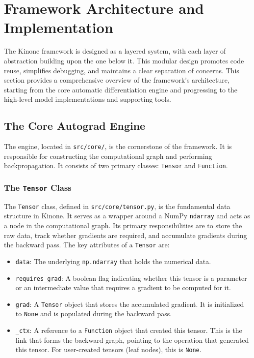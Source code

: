 \documentclass[a4paper]{article}
\begin{document}
\section{Framework Architecture and Implementation}

The Kinone framework is designed as a layered system, with each layer of abstraction building upon the one below it. This modular design promotes code reuse, simplifies debugging, and maintains a clear separation of concerns. This section provides a comprehensive overview of the framework's architecture, starting from the core automatic differentiation engine and progressing to the high-level model implementations and supporting tools.

\subsection{The Core Autograd Engine}

The engine, located in \texttt{src/core/}, is the cornerstone of the framework. It is responsible for constructing the computational graph and performing backpropagation. It consists of two primary classes: \texttt{Tensor} and \texttt{Function}.

\subsubsection{The \texttt{Tensor} Class}

The \texttt{Tensor} class, defined in \texttt{src/core/tensor.py}, is the fundamental data structure in Kinone. It serves as a wrapper around a NumPy \texttt{ndarray} and acts as a node in the computational graph. Its primary responsibilities are to store the raw data, track whether gradients are required, and accumulate gradients during the backward pass. The key attributes of a \texttt{Tensor} are:

\begin{itemize}
    \item \texttt{data}: The underlying \texttt{np.ndarray} that holds the numerical data.
    \item \texttt{requires\_grad}: A boolean flag indicating whether this tensor is a parameter or an intermediate value that requires a gradient to be computed for it.
    \item \texttt{grad}: A \texttt{Tensor} object that stores the accumulated gradient. It is initialized to \texttt{None} and is populated during the backward pass.
    \item \texttt{\_ctx}: A reference to a \texttt{Function} object that created this tensor. This is the link that forms the backward graph, pointing to the operation that generated this tensor. For user-created tensors (leaf nodes), this is \texttt{None}.
\end{itemize}
\end{document}

